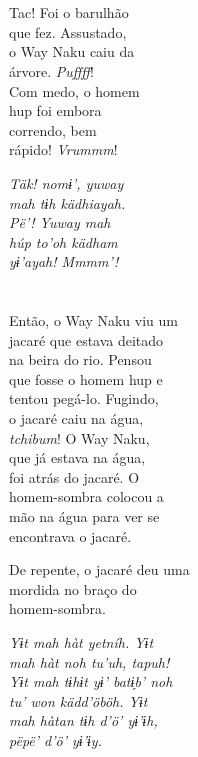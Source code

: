 \chapter{}

Tac! Foi o barulhão\\
que fez. Assustado,\\
o Way Naku caiu da\\
árvore. \textit{Puffff}!\\
Com medo, o homem\\
hup foi embora\\
correndo, bem\\
rápido! \textit{Vrummm}!

\textit{Täk! nomɨ’, yuway\\
mah tɨh kädhiayah.\\
\textit{Pë’}! Yuway mah\\
húp to’oh kädham\\
yɨ’ayah! \textit{Mmmm’}!}

\chapter{}

Então, o Way Naku viu um\\
jacaré que estava deitado\\
na beira do rio. Pensou\\
que fosse o homem hup e\\
tentou pegá-lo. Fugindo,\\
o jacaré caiu na água,\\
\textit{tchibum}! O Way Naku,\\
que já estava na água,\\
foi atrás do jacaré. O\\
homem-sombra colocou a\\
mão na água para ver se\\
encontrava o jacaré.

De repente, o jacaré deu uma\\
mordida no braço do\\
homem-sombra.

\textit{Yɨt mah hàt yetníh. Yɨt\\
mah hàt noh tu’uh, \textit{tapuh}!\\
Yɨt mah tɨhɨt yɨ’ batɨ̗b’ noh\\
tu’ won kädd’öböh. Yɨt\\
mah hàtan tɨh d’ö’ yɨ’ɨh,\\
pëpë’ d’ö’ yɨ’ɨy.}

